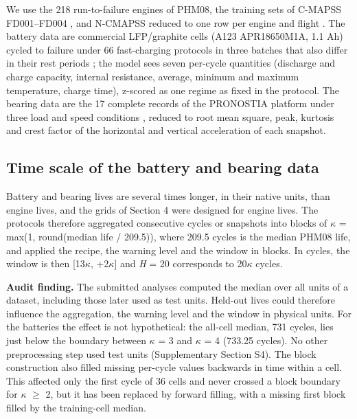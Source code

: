 \documentclass[a4paper,fleqn,doubleblind]{cas-dc}
\begin{document}
We use the 218 run-to-failure engines of PHM08, the training sets of C-MAPSS FD001--FD004 \cite{saxena2008}, and N-CMAPSS reduced to one row per engine and flight \cite{ariaschao2021}. The battery data are commercial LFP/graphite cells (A123 APR18650M1A, 1.1 Ah) cycled to failure under 66 fast-charging protocols in three batches that also differ in their rest periods \cite{severson2019}; the model sees seven per-cycle quantities (discharge and charge capacity, internal resistance, average, minimum and maximum temperature, charge time), z-scored as one regime as fixed in the protocol. The bearing data are the 17 complete records of the PRONOSTIA platform under three load and speed conditions \cite{nectoux2012}, reduced to root mean square, peak, kurtosis and crest factor of the horizontal and vertical acceleration of each snapshot.

\subsection{Time scale of the battery and bearing data}

Battery and bearing lives are several times longer, in their native units, than engine lives, and the grids of Section 4 were designed for engine lives. The protocols therefore aggregated consecutive cycles or snapshots into blocks of $\kappa$ = max(1, round(median life / 209.5)), where 209.5 cycles is the median PHM08 life, and applied the recipe, the warning level and the window in blocks. In cycles, the window is then [\textminus{}13$\kappa$, +2$\kappa$] and \textit{H} = 20 corresponds to 20$\kappa$ cycles.

\textbf{Audit finding.} The submitted analyses computed the median over all units of a dataset, including those later used as test units. Held-out lives could therefore influence the aggregation, the warning level and the window in physical units. For the batteries the effect is not hypothetical: the all-cell median, 731 cycles, lies just below the boundary between $\kappa$ = 3 and $\kappa$ = 4 (733.25 cycles). No other preprocessing step used test units (Supplementary Section S4). The block construction also filled missing per-cycle values backwards in time within a cell. This affected only the first cycle of 36 cells and never crossed a block boundary for $\kappa$ $\ge$ 2, but it has been replaced by forward filling, with a missing first block filled by the training-cell median.
\end{document}
